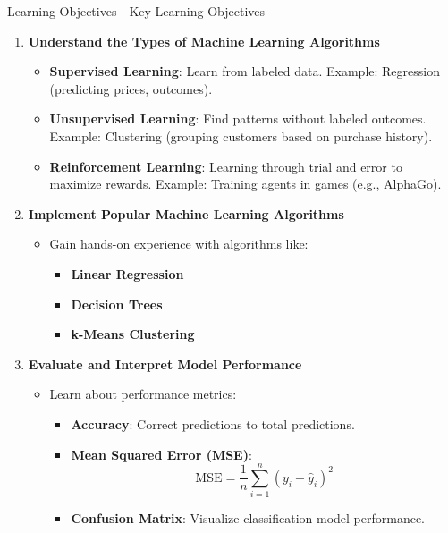 \documentclass[aspectratio=169]{beamer}
\begin{document}
\begin{frame}[fragile]{Learning Objectives - Key Learning Objectives}
    \begin{enumerate}
        \item \textbf{Understand the Types of Machine Learning Algorithms}
        \begin{itemize}
            \item \textbf{Supervised Learning}: Learn from labeled data. Example: Regression (predicting prices, outcomes).
            \item \textbf{Unsupervised Learning}: Find patterns without labeled outcomes. Example: Clustering (grouping customers based on purchase history).
            \item \textbf{Reinforcement Learning}: Learning through trial and error to maximize rewards. Example: Training agents in games (e.g., AlphaGo).
        \end{itemize}

        \item \textbf{Implement Popular Machine Learning Algorithms}
        \begin{itemize}
            \item Gain hands-on experience with algorithms like:
            \begin{itemize}
                \item \textbf{Linear Regression}
                \item \textbf{Decision Trees}
                \item \textbf{k-Means Clustering}
            \end{itemize}
        \end{itemize}

        \item \textbf{Evaluate and Interpret Model Performance}
        \begin{itemize}
            \item Learn about performance metrics:
            \begin{itemize}
                \item \textbf{Accuracy}: Correct predictions to total predictions.
                \item \textbf{Mean Squared Error (MSE)}:
                \begin{equation}
                    \text{MSE} = \frac{1}{n} \sum_{i=1}^{n} (y_i - \hat{y}_i)^2
                \end{equation}
                \item \textbf{Confusion Matrix}: Visualize classification model performance.
            \end{itemize}
        \end{itemize}
    \end{enumerate}
\end{frame}
\end{document}
